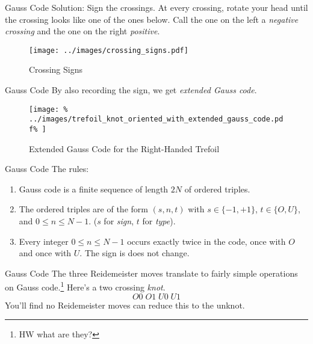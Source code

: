 \documentclass{beamer}
\begin{document}
    \begin{frame}{Gauss Code}
        Solution: Sign the crossings. At every crossing, rotate your head until
        the crossing looks like one of the ones below. Call the one on the left
        a \textit{negative crossing} and the one on the right \textit{positive}.
        \begin{figure}
            \centering
            \texttt{[image: ../images/crossing\_signs.pdf]}
            \caption{Crossing Signs}
            \label{fig:crossing_signs}
        \end{figure}
    \end{frame}
    \begin{frame}{Gauss Code}
        By also recording the sign, we get \textit{extended Gauss code}.
        \begin{figure}
            \centering
            \texttt{[image: \%
                ../images/trefoil\_knot\_oriented\_with\_extended\_gauss\_code.pdf\%
            ]}
            \caption{Extended Gauss Code for the Right-Handed Trefoil}
            \label{fig:right_hand_trefoil_extended_gauss}
        \end{figure}
    \end{frame}
    \begin{frame}{Gauss Code}
        The rules:
        \begin{enumerate}
            \item Gauss code is a finite sequence of length $2N$ of ordered
                  triples.
            \item The ordered triples are of the form $(s,n,t)$ with
                  $s\in\{-1,+1\}$, $t\in\{O,U\}$, and $0\leq{n}\leq{N-1}$.
                  ($s$ for \textit{sign}, $t$ for \textit{type}).
            \item Every integer $0\leq{n}\leq{N-1}$ occurs exactly twice in the
                  code, once with $O$ and once with $U$. The sign is does not
                  change.
        \end{enumerate}
    \end{frame}
    \begin{frame}{Gauss Code}
        The three Reidemeister moves translate to fairly simple operations on
        Gauss code.\footnote{HW what are they?}
        Here's a two crossing \textit{knot}.
        \begin{equation}
            O0\;O1\;U0\;U1
        \end{equation}
        You'll find no Reidemeister moves can reduce this to the unknot.
    \end{frame}
\end{document}

